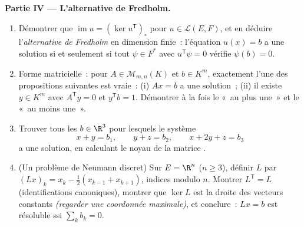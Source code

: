\begin{problem}
\medskip
\noindent\textbf{Partie IV --- L'alternative de Fredholm.}
\begin{enumerate}[resume]
  \item Démontrer que $\operatorname{im} u = (\ker u^{\mathsf
        T})_\circ$ pour $u \in \mathcal{L}(E, F)$, et en déduire
        l'\emph{alternative de Fredholm} en dimension finie~: l'équation
        $u(x) = b$ a une solution si et seulement si tout
        $\psi \in F^*$ avec $u^{\mathsf T}\psi = 0$ vérifie
        $\psi(b) = 0$.
  \item Forme matricielle~: pour $A \in \mathcal{M}_{m,n}(K)$ et $b \in
        K^m$, exactement l'une des propositions suivantes est vraie~: (i) $Ax = b$
        a une solution~; (ii) il existe $y \in K^m$ avec
        $A^{\mathsf T}y = 0$ et $y^{\mathsf T}b = 1$. Démontrer à la fois
        le «~au plus une~» et le «~au moins une~».
  \item Trouver tous les $b \in \R^3$ pour lesquels le système
        \[
        x + y = b_1, \qquad y + z = b_2, \qquad x + 2y + z = b_3
        \]
        a une solution, en calculant le noyau de la matrice
        .
  \item (Un problème de Neumann discret) Sur $E = \R^n$ ($n \geq 3$),
        définir $L$ par $(Lx)_k = x_k - \frac12(x_{k-1} +
        x_{k+1})$, indices modulo $n$. Montrer $L^{\mathsf T} = L$
        (identifications canoniques), montrer que $\ker L$ est la
        droite des vecteurs constants \emph{(regarder une coordonnée
        maximale)}, et conclure~: $Lx = b$ est résoluble ssi
        $\sum_k b_k = 0$.
\end{enumerate}


\end{problem}
